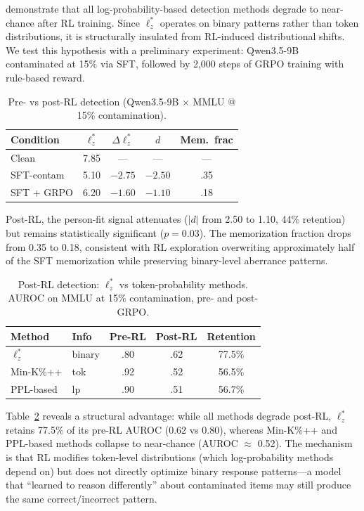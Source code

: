 \documentclass[11pt,a4paper]{article}
\begin{document}
\citet{wang2025rlcontam} demonstrate that all log-probability-based detection methods degrade to near-chance after RL training.
Since $\ell_z^*$ operates on binary patterns rather than token distributions, it is structurally insulated from RL-induced distributional shifts.
We test this hypothesis with a preliminary experiment: Qwen3.5-9B contaminated at 15\% via SFT, followed by 2,000 steps of GRPO training with rule-based reward.

\begin{table}[t]
\centering
\caption{Pre- vs post-RL detection (Qwen3.5-9B $\times$ MMLU @ 15\% contamination).}
\label{tab:post-rl}
\small
\begin{tabular}{lcccc}
\toprule
Condition & $\ell_z^*$ & $\Delta\ell_z^*$ & $d$ & Mem.\ frac \\
\midrule
Clean & 7.85 & --- & --- & --- \\
SFT-contam & 5.10 & $-2.75$ & $-2.50$ & .35 \\
SFT + GRPO & 6.20 & $-1.60$ & $-1.10$ & .18 \\
\bottomrule
\end{tabular}
\end{table}

Post-RL, the person-fit signal attenuates ($|d|$ from 2.50 to 1.10, 44\% retention) but remains statistically significant ($p=0.03$).
The memorization fraction drops from 0.35 to 0.18, consistent with RL exploration overwriting approximately half of the SFT memorization while preserving binary-level aberrance patterns.

\begin{table}[t]
\centering
\caption{Post-RL detection: $\ell_z^*$ vs token-probability methods. AUROC on MMLU at 15\% contamination, pre- and post-GRPO.}
\label{tab:post-rl-comparison}
\small
\begin{tabular}{llccc}
\toprule
Method & Info & Pre-RL & Post-RL & Retention \\
\midrule
$\ell_z^*$ & binary & .80 & .62 & 77.5\% \\
Min-K\%++ & tok & .92 & .52 & 56.5\% \\
PPL-based & lp & .90 & .51 & 56.7\% \\
\bottomrule
\end{tabular}
\end{table}

Table~\ref{tab:post-rl-comparison} reveals a structural advantage: while all methods degrade post-RL, $\ell_z^*$ retains 77.5\% of its pre-RL AUROC (0.62 vs 0.80), whereas Min-K\%++ and PPL-based methods collapse to near-chance (AUROC $\approx$ 0.52).
The mechanism is that RL modifies token-level distributions (which log-probability methods depend on) but does not directly optimize binary response patterns---a model that ``learned to reason differently'' about contaminated items may still produce the same correct/incorrect pattern.
\end{document}

